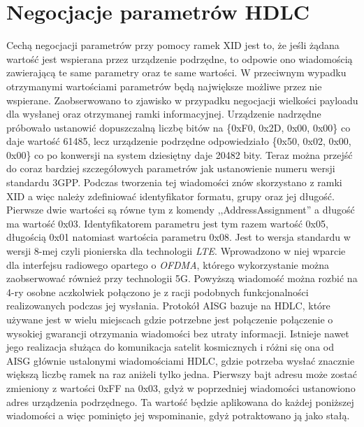     \section{Negocjacje parametrów HDLC}
    Cechą negocjacji parametrów przy pomocy ramek XID jest to, że jeśli żądana wartość jest wspierana przez
    urządzenie podrzędne, to odpowie ono wiadomością zawierającą te same parametry oraz te same wartości. 
    W przeciwnym wypadku otrzymanymi wartościami parametrów będą największe możliwe przez nie wspierane.
    Zaobserwowano to zjawisko w przypadku negocjacji wielkości payloadu dla wysłanej oraz otrzymanej ramki informacyjnej.
    Urządzenie nadrzędne próbowało ustanowić dopuszczalną liczbę bitów na \{0xF0, 0x2D, 0x00, 0x00\} co daje wartość 61485,
    lecz urządzenie podrzędne odpowiedziało \{0x50, 0x02, 0x00, 0x00\} co po konwersji na system dziesiętny daje 20482 bity.
    \newline\newline
	Teraz można przejść do coraz bardziej szczegółowych parametrów jak ustanowienie numeru wersji standardu 3GPP.
	Podczas tworzenia tej wiadomości znów skorzystano z ramki XID a więc należy zdefiniować identyfikator formatu, grupy oraz jej długość.
    Pierwsze dwie wartości są równe tym z komendy ,,AddressAssignment'' a długość ma wartość 0x03.
	Identyfikatorem parametru jest tym razem wartość 0x05, długością 0x01 natomiast wartościa parametru 0x08.
    Jest to wersja standardu w wersji 8-mej czyli pionierska dla technologii \textit{LTE}.
	Wprowadzono w niej wparcie dla interfejsu radiowego opartego o \textit{OFDMA}, którego wykorzystanie można zaobserwować również przy technologii 5G.
    \newline\newline
	Powyższą wiadomość można rozbić na 4-ry osobne aczkolwiek połączono je z racji podobnych funkcjonalności realizowanych podczas jej wysłania.
    Protokół AISG bazuje na HDLC, które używane jest w wielu miejscach
	gdzie potrzebne jest połączenie połączenie o wysokiej gwarancji otrzymania wiadomości bez utraty informacji.
    Istnieje nawet jego realizacja służąca do komunikacja satelit kosmicznych i różni się ona od AISG głównie
	ustalonymi wiadomościami HDLC, gdzie potrzeba wysłać znacznie większą liczbę ramek na raz aniżeli tylko jedna.
	Pierwszy bajt adresu może zostać zmieniony z wartości 0xFF na 0x03, gdyż w poprzedniej wiadomości ustanowiono adres urządzenia podrzędnego.
    Ta wartość będzie aplikowana do każdej poniższej wiadomości a więc pominięto jej wspominanie,
	gdyż potraktowano ją jako stałą.


